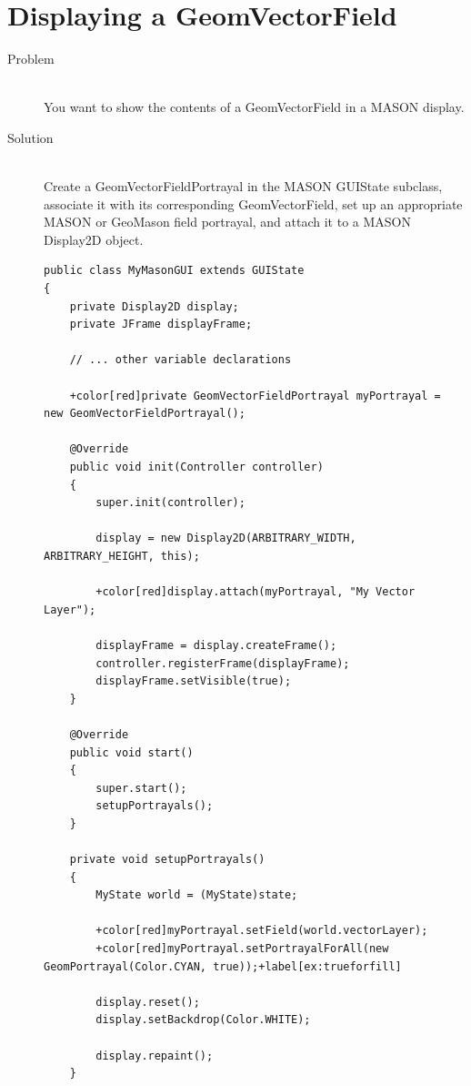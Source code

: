 \documentclass[twoside,10pt]{book}
\newcommand\code[1]{\textsf{#1}}
\begin{document}
\section{Displaying a \code{GeomVectorField}}
\label{sec:displayingGeomVectorField}

\begin{description}
\item[Problem]~\\
You want to show the contents of a \code{GeomVectorField} in a
MASON display.

\item[Solution]~\\
Create a \code{GeomVectorFieldPortrayal} in the MASON \code{GUIState}
subclass, associate it with its corresponding \code{GeomVectorField},
set up an appropriate MASON or GeoMason field portrayal, and attach it
to a MASON \code{Display2D} object.

\begin{Verbatim}[frame=lines,framesep=5mm,commandchars=+\[\]]
public class MyMasonGUI extends GUIState
{
    private Display2D display;
    private JFrame displayFrame;

    // ... other variable declarations

    +color[red]private GeomVectorFieldPortrayal myPortrayal = new GeomVectorFieldPortrayal();

    @Override
    public void init(Controller controller)
    {
        super.init(controller);

        display = new Display2D(ARBITRARY_WIDTH, ARBITRARY_HEIGHT, this);

        +color[red]display.attach(myPortrayal, "My Vector Layer");

        displayFrame = display.createFrame();
        controller.registerFrame(displayFrame);
        displayFrame.setVisible(true);
    }

    @Override
    public void start()
    {
        super.start();
        setupPortrayals();
    }

    private void setupPortrayals()
    {
        MyState world = (MyState)state;

        +color[red]myPortrayal.setField(world.vectorLayer);
        +color[red]myPortrayal.setPortrayalForAll(new GeomPortrayal(Color.CYAN, true));+label[ex:trueforfill]

        display.reset();
        display.setBackdrop(Color.WHITE);

        display.repaint();
    }


\end{Verbatim}
\end{description}
\end{document}
